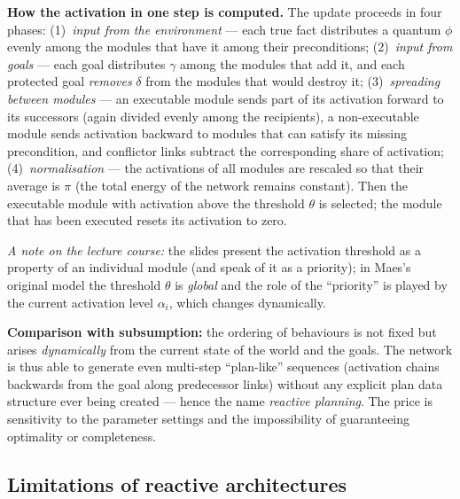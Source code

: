 \documentclass[11pt,a4paper]{article}
\theoremstyle{definition}
\providecommand{\uv}[1]{``#1''}
\begin{document}
\textbf{How the activation in one step is computed.} The update proceeds in four phases:
(1)~\emph{input from the environment} --- each true fact distributes a quantum $\phi$ evenly among
the modules that have it among their preconditions; (2)~\emph{input from goals} --- each goal
distributes $\gamma$ among the modules that add it, and each protected goal \emph{removes} $\delta$
from the modules that would destroy it; (3)~\emph{spreading between modules} --- an executable module
sends part of its activation forward to its successors (again divided evenly among the recipients), a
non-executable module sends activation backward to modules that can satisfy its missing precondition,
and conflictor links subtract the corresponding share of activation; (4)~\emph{normalisation} --- the
activations of all modules are rescaled so that their average is $\pi$ (the total energy of the
network remains constant). Then the executable module with activation above the threshold $\theta$ is
selected; the module that has been executed resets its activation to zero.

\emph{A note on the lecture course:} the slides present the activation threshold as a property of an
individual module (and speak of it as a priority); in Maes's original model the threshold $\theta$ is
\emph{global} and the role of the \uv{priority} is played by the current activation level
$\alpha_i$, which changes dynamically.

\medskip\noindent
\textbf{Comparison with subsumption:} the ordering of behaviours is not fixed but arises
\emph{dynamically} from the current state of the world and the goals. The network is thus able to
generate even multi-step \uv{plan-like} sequences (activation chains backwards from the goal along
predecessor links) without any explicit plan data structure ever being created --- hence the name
\emph{reactive planning}. The price is sensitivity to the parameter settings and the impossibility of
guaranteeing optimality or completeness.

\subsection{Limitations of reactive architectures}
\end{document}
